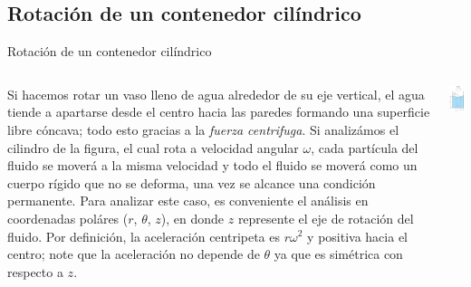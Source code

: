 \documentclass [xcolor=svgnames, t] {beamer}
\begin{document}
\subsection{Rotaci\'on de un contenedor cil\'indrico}
\begin{frame}{Rotaci\'on de un contenedor cil\'indrico}
\vspace{-0.4cm}
\small
\begin{columns}
Si hacemos rotar un vaso lleno de agua alrededor de su eje vertical, el agua tiende a apartarse desde el centro hacia las paredes formando una superficie libre c\'oncava; todo esto gracias a la \emph{fuerza centrifuga}. Si analiz\'amos el cilindro de la figura, el cual rota a velocidad angular $\omega$,  cada part\'icula del fluido se mover\'a a la misma velocidad y todo el fluido se mover\'a como un cuerpo r\'igido que no se deforma, una vez se alcance una condici\'on permanente. Para analizar este caso, es conveniente el an\'alisis en coordenadas pol\'ares ($r$, $\theta$, $z$), en donde $z$ represente el eje de rotaci\'on del fluido. Por definici\'on, la aceleraci\'on centripeta es $r \omega^2$ y positiva hacia el centro; note que la aceleraci\'on no depende de $\theta$ ya que es sim\'etrica con respecto a $z$. 
\vspace{-0.4cm}
\begin{center}
\includegraphics[width=4cm]{cili}
\end{center}
\end{columns}
\end{frame}
\end{document}
